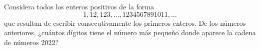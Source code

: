 Considera todos los enteros positivos de la forma
\[1, 12, 123, \dots, 1234567891011, \dots\]
que resultan de escribir consecutivamente los primeros enteros. De los números anteriores, ¿cuántos dígitos tiene el número más pequeño donde aparece la cadena de números $2022$?